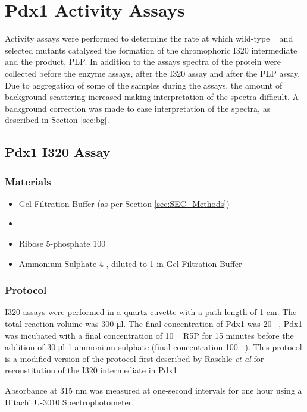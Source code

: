 \newpage
	\section{Pdx1 Activity Assays}\label{sec:Assay_Methods}
	Activity assays were performed to determine the rate at which wild-type \atpdx~ and selected mutants catalysed the formation of the chromophoric I320 intermediate and the product, PLP. In addition to the assays spectra of the protein were collected before the enzyme assays, after the I320 assay and after the PLP assay. Due to aggregation of some of the samples during the assays, the amount of background scattering increased making interpretation of the spectra difficult. A background correction was made to ease interpretation of the spectra, as described in Section \ref{sec:bg}.  
		\subsection*{Pdx1 I320 Assay}	 \label{sec:320_assay_methods}
		\subsubsection{Materials}
				\begin{itemize}
				\item Gel Filtration Buffer (as per Section \ref{sec:SEC_Methods}) 
				\item \atpdx
				\item Ribose 5-phosphate 100 \si{\milli\molar}
				\item Ammonium Sulphate 4 \si{\molar}, diluted to 1 \si{\molar} in Gel Filtration Buffer
				\end{itemize}
		\subsubsection{Protocol}I320 assays were performed in a quartz cuvette with a path length of 1 \si{\centi\metre}. The total reaction volume was 300 \si{\micro\litre}. The final concentration of Pdx1 was 20 \si{\micro\molar}, Pdx1 was incubated with a final concentration of 10 \si{\milli\molar} R5P for 15 minutes before the addition of 30 \si{\micro\litre} 1 \si{\molar} ammonium sulphate (final concentration 100 \si{\milli\molar}). This protocol is a modified version of the protocol first described by Raschle \textit{et al} for reconstitution of the I320 intermediate in Pdx1 \cite{Raschle2007}. \par
Absorbance at 315 \si{\nano\metre} was measured at one-second intervals for one hour using a Hitachi U-3010 Spectrophotometer. 

